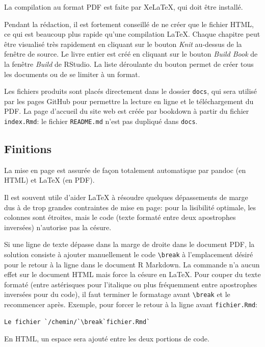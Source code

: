 \documentclass[
  12pt,
  french,
  a4paper,
  extrafontsizes,onecolumn,openright
  ]{memoir}
\begin{document}
La compilation au format PDF est faite par XeLaTeX, qui doit être installé.

Pendant la rédaction, il est fortement conseillé de ne créer que le fichier HTML, ce qui est beaucoup plus rapide qu'une compilation LaTeX.
Chaque chapitre peut être visualisé très rapidement en cliquant sur le bouton \emph{Knit} au-dessus de la fenêtre de source.
Le livre entier est créé en cliquant sur le bouton \emph{Build Book} de la fenêtre \emph{Build} de RStudio.
La liste déroulante du bouton permet de créer tous les documents ou de se limiter à un format.

Les fichiers produits sont placés directement dans le dossier \texttt{docs}, qui sera utilisé par les pages GitHub pour permettre la lecture en ligne et le téléchargement du PDF.
La page d'accueil du site web est créée par bookdown à partir du fichier \texttt{index.Rmd}: le fichier \texttt{README.md} n'est pas dupliqué dans \texttt{docs}.

\hypertarget{finitions}{%
\subsection{Finitions}\label{finitions}}

La mise en page est assurée de façon totalement automatique par pandoc (en HTML) et LaTeX (en PDF).

Il est souvent utile d'aider LaTeX à résoudre quelques dépassements de marge dus à de trop grandes contraintes de mise en page: pour la lisibilité optimale, les colonnes sont étroites, mais le code (texte formaté entre deux apostrophes inversées) n'autorise pas la césure.

Si une ligne de texte dépasse dans la marge de droite dans le document PDF, la solution consiste à ajouter manuellement le code \texttt{\textbackslash{}break} à l'emplacement désiré pour le retour à la ligne dans le document R Markdown.
La commande n'a aucun effet sur le document HTML mais force la césure en LaTeX.
Pour couper du texte formaté (entre astérisques pour l'italique ou plus fréquemment entre apostrophes inversées pour du code), il faut terminer le formatage avant \texttt{\textbackslash{}break} et le recommencer après.
Exemple, pour forcer le retour à la ligne avant \texttt{fichier.Rmd}:

\begin{verbatim}
Le fichier `/chemin/`\break`fichier.Rmd`
\end{verbatim}

En HTML, un espace sera ajouté entre les deux portions de code.
\end{document}
